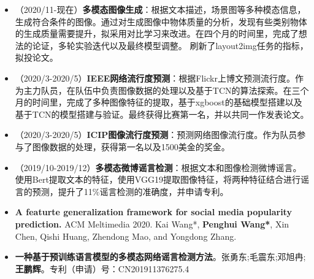 \documentclass[zh]{resume}
\begin{document}
\begin{itemize}
  \item  （2020/11-现在）\textbf{多模态图像生成}：根据文本描述，场景图等多种模态信息，生成符合条件的图像。通过对生成图像中物体质量的分析，发现有些类别物体的生成质量需要提升，拟采用对比学习来改进。在四个月的时间里，完成了想法的论证，多轮实验迭代以及最终模型调整。 刷新了layout2img任务的指标，拟投论文。
  \item （2020/3-2020/5）\textbf{IEEE网络流行度预测}：根据Flickr上博文预测流行度。作为主力队员，在队伍中负责图像数据的处理以及基于TCN的算法探索。在三个月的时间里，完成了多种图像特征的提取，基于xgboost的基础模型搭建以及基于TCN的模型搭建与验证。最终获得比赛第一名，并以共同一作发表论文。
  \item （2020/3-2020/5）\textbf{ICIP图像流行度预测}：预测网络图像流行度。作为队员参与了图像数据的处理，获得第一名以及1500美金的奖金。
  \item （2019/10-2019/12）\textbf{多模态微博谣言检测}：根据文本和图像检测微博谣言。使用Bert提取文本的特征，使用VGG19提取图像特征，将两种特征结合进行谣言的预测，提升了11$\%$谣言检测的准确度，并申请专利。

\end{itemize}

\begin{itemize}
  \item \textbf{A featurte generalization framework for social media popularity prediction.} ACM Meltimedia 2020. 
  Kai Wang*, \textbf{Penghui Wang*}, Xin Chen, Qishi Huang, Zhendong Mao, and Yongdong Zhang.
  \item \textbf{一种基于预训练语言模型的多模态网络谣言检测方法}。张勇东;毛震东;邓旭冉;\textbf{王鹏辉}。专利（申请）号：CN201911376275.4

\end{itemize}

\end{document}
